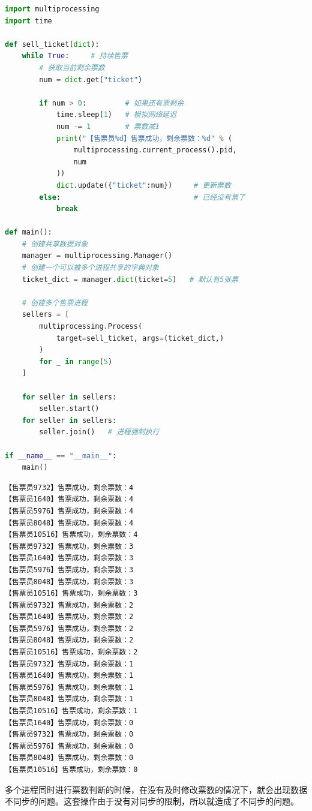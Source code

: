 \begin{lstlisting}[language=Python]
import multiprocessing
import time

def sell_ticket(dict):
	while True:     # 持续售票
		# 获取当前剩余票数
		num = dict.get("ticket")
		
		if num > 0:         # 如果还有票剩余
			time.sleep(1)   # 模拟网络延迟
			num -= 1        # 票数减1
			print("【售票员%d】售票成功，剩余票数：%d" % (
				multiprocessing.current_process().pid,
				num
			))
			dict.update({"ticket":num})     # 更新票数
		else:                				# 已经没有票了
			break

def main():
	# 创建共享数据对象
	manager = multiprocessing.Manager()
	# 创建一个可以被多个进程共享的字典对象
	ticket_dict = manager.dict(ticket=5)   # 默认有5张票

	# 创建多个售票进程
	sellers = [
		multiprocessing.Process(
			target=sell_ticket, args=(ticket_dict,)
		) 
		for _ in range(5)
	]

	for seller in sellers:
		seller.start()
	for seller in sellers:
		seller.join()   # 进程强制执行

if __name__ == "__main__":
	main()
\end{lstlisting}

\begin{tcolorbox}
    \begin{verbatim}
【售票员9732】售票成功，剩余票数：4
【售票员1640】售票成功，剩余票数：4
【售票员5976】售票成功，剩余票数：4
【售票员8048】售票成功，剩余票数：4
【售票员10516】售票成功，剩余票数：4
【售票员9732】售票成功，剩余票数：3
【售票员1640】售票成功，剩余票数：3
【售票员5976】售票成功，剩余票数：3
【售票员8048】售票成功，剩余票数：3
【售票员10516】售票成功，剩余票数：3
【售票员9732】售票成功，剩余票数：2
【售票员1640】售票成功，剩余票数：2
【售票员5976】售票成功，剩余票数：2
【售票员8048】售票成功，剩余票数：2
【售票员10516】售票成功，剩余票数：2
【售票员9732】售票成功，剩余票数：1
【售票员1640】售票成功，剩余票数：1
【售票员5976】售票成功，剩余票数：1
【售票员8048】售票成功，剩余票数：1
【售票员10516】售票成功，剩余票数：1
【售票员1640】售票成功，剩余票数：0
【售票员9732】售票成功，剩余票数：0
【售票员5976】售票成功，剩余票数：0
【售票员8048】售票成功，剩余票数：0
【售票员10516】售票成功，剩余票数：0
	\end{verbatim}
\end{tcolorbox}

多个进程同时进行票数判断的时候，在没有及时修改票数的情况下，就会出现数据不同步的问题。这套操作由于没有对同步的限制，所以就造成了不同步的问题。\\

